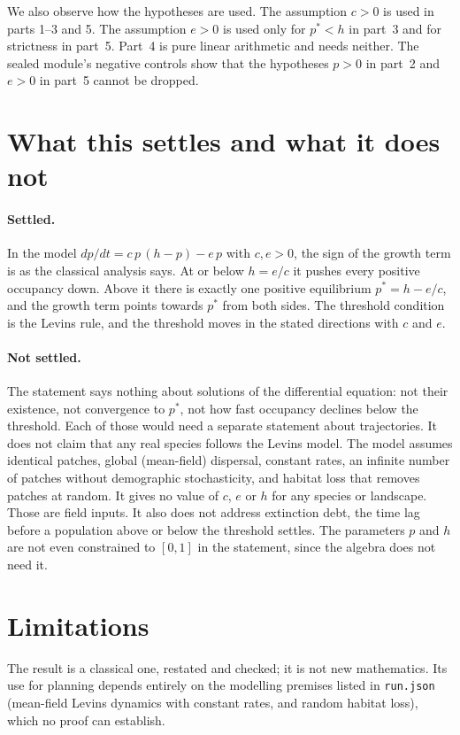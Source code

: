\documentclass[11pt]{article}
\begin{document}
We also observe how the hypotheses are used. The assumption $c>0$ is used in parts 1--3 and 5.
The assumption $e>0$ is used only for $p^*<h$ in part~3 and for strictness in part~5. Part~4 is
pure linear arithmetic and needs neither. The sealed module's negative controls show that the
hypotheses $p>0$ in part~2 and $e>0$ in part~5 cannot be dropped.

\section{What this settles and what it does not}
\paragraph{Settled.} In the model $dp/dt=c\,p\,(h-p)-e\,p$ with $c,e>0$, the sign of the growth term
is as the classical analysis says. At or below $h=e/c$ it pushes every positive occupancy down.
Above it there is exactly one positive equilibrium $p^*=h-e/c$, and the growth term points
towards $p^*$ from both sides. The threshold condition is the Levins rule, and the threshold
moves in the stated directions with $c$ and $e$.

\paragraph{Not settled.} The statement says nothing about solutions of the differential
equation: not their existence, not convergence to $p^*$, not how fast occupancy declines below
the threshold. Each of those would need a separate statement about trajectories. It does not
claim that any real species follows the Levins model. The model assumes identical patches,
global (mean-field) dispersal, constant rates, an infinite number of patches without demographic
stochasticity, and habitat loss that removes patches at random. It gives no value of $c$, $e$ or
$h$ for any species or landscape. Those are field inputs. It also does not address extinction
debt, the time lag before a population above or below the threshold settles. The parameters $p$
and $h$ are not even constrained to $[0,1]$ in the statement, since the algebra does not need it.

\section{Limitations}
The result is a classical one, restated and checked; it is not new mathematics. Its use for
planning depends entirely on the modelling premises listed in \texttt{run.json} (mean-field Levins
dynamics with constant rates, and random habitat loss), which no proof can establish.
\end{document}
